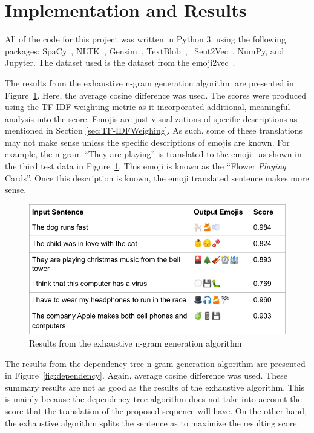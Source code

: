 \documentclass{article}[10]
\newcommand*{\img}[1]{%
  \raisebox{-.3\baselineskip}{%
    \texttt{[image: \#1]}%
  }%
}
\begin{document}
\section{Implementation and Results\label{sec:implementationAndResults}}

All of the code for this project was written in Python 3, using the
following packages: SpaCy~\cite{spacy2}, NLTK~\cite{bird2009natural},
Gensim~\cite{gensim}, TextBlob~\cite{TextBlob},
~Sent2Vec~\cite{pg2017unsu}, NumPy\cite{numpy}, and
Jupyter\cite{Kluyver:2016aa}. The dataset used is the dataset from the
emoji2vec~\cite{Eisner_2016}.

The results from the exhaustive n-gram generation algorithm are
presented in Figure~\ref{fig:extractive}. Here, the average cosine difference was
used. The scores were produced using the TF-IDF weighting metric as it incorporated additional, meaningful analysis into the
score. Emojis are just visualizations of specific descriptions as mentioned in
Section \ref{sec:TF-IDFWeighing}. As such, some of these translations may not
make sense unless the specific descriptions of emojis are known. For example,
the n-gram ``They are playing'' is translated to the
emoji~\img{emojis/1f3b4.png} as shown in the third test data in
Figure~\ref{fig:extractive}. This emoji is known as the ``Flower \emph{Playing}
Cards''. Once this description is known, the emoji translated sentence makes more sense.

\begin{figure}[H]
  \begin{center}
    \includegraphics[width=\columnwidth]{figures/extractive.png}
    \caption{Results from the exhaustive n-gram generation algorithm\label{fig:extractive}}
  \end{center}
\end{figure}

The results from the dependency tree n-gram generation algorithm are
presented in Figure~\ref{fig:dependency}. Again, average cosine difference was
used.  These summary
results are not as good as the results of the exhaustive algorithm.
This is mainly because the dependency tree algorithm does not take
into account the score that the translation of the proposed sequence
will have. On the other hand, the exhaustive algorithm splits the
sentence as to maximize the resulting score.
\end{document}
